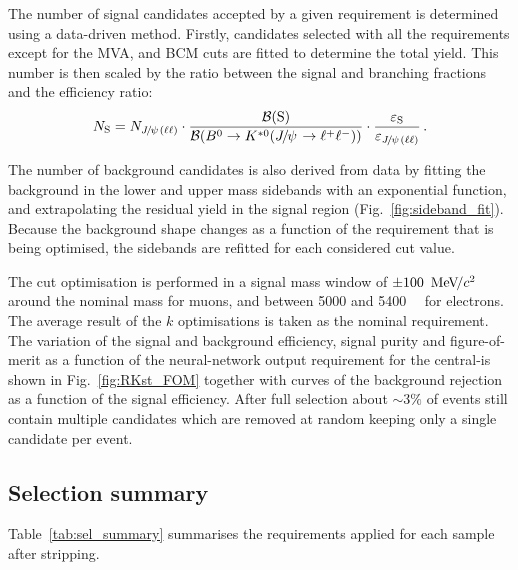 The number of signal candidates accepted by a given requirement is determined using a data-driven method.
Firstly, \mbox{\BdToKstJPsll} candidates selected with all the requirements except for the MVA, and BCM cuts 
are fitted to determine the total yield. 
This number is then scaled by the ratio between the signal and \mbox{\BdToKstJPsll} branching fractions and
the efficiency ratio: 
%
$$N_{\mathrm{S}} = N_{\jpsi(\ell\ell)} \cdot
\frac{\BR(\mathrm{S})}{\BR(\BdToKstJPsll)} \cdot
\frac{\varepsilon_{\mathrm{S}}}{\varepsilon_{\jpsi(\ell\ell)}} \, .$$

The number of background candidates is also derived from data by fitting the background in the lower and upper 
mass sidebands with an exponential function, and extrapolating the residual yield in the signal region (Fig.~\ref{fig:sideband_fit}).
Because the background shape changes as a function of the requirement that is being optimised, the sidebands are refitted for each considered cut value.
%

The cut optimisation is performed in a signal mass window of $\pm100~{\mathrm{\,Me\kern -0.1em V\!/}c^2}$ around the nominal \Bz mass for muons, and between 5000 and 5400~\mevcc~ for electrons.
The average result of the $k$ optimisations is taken as the nominal requirement.
%
%
%
The variation of the signal and background efficiency, signal purity and figure-of-merit as a function of the neural-network output
requirement for the central-\qsq is shown in Fig.~\ref{fig:RKst_FOM}
together with curves of the background rejection as a function of the signal efficiency.
%
%
After full selection about $\sim 3\%$ of events still contain multiple candidates
which are removed at random keeping only a single candidate per event.

\clearpage

\subsection{Selection summary}

Table~\ref{tab:sel_summary} summarises the requirements applied for each sample after stripping.

